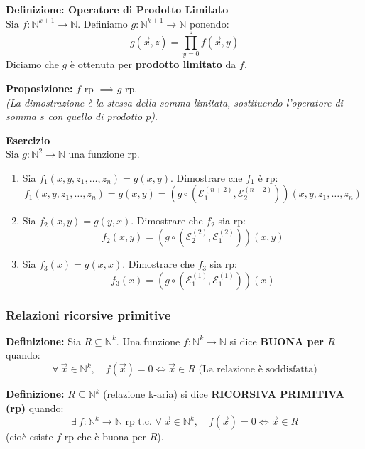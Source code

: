 \vspace{0.4cm}
\textbf{Definizione: Operatore di Prodotto Limitato} \\
Sia $f : \mathbb{N}^{k+1} \to \mathbb{N}$. Definiamo $g : \mathbb{N}^{k+1} \to \mathbb{N}$ ponendo:
$$ g(\vec{x}, z) = \prod_{y=0}^{z} f(\vec{x}, y) $$
Diciamo che $g$ è ottenuta per \textbf{prodotto limitato} da $f$.

\vspace{0.4cm}
\textbf{Proposizione:} $f$ rp $\implies g$ rp. \\
\textit{(La dimostrazione è la stessa della somma limitata, sostituendo l'operatore di somma $s$ con quello di prodotto $p$)}.

\vspace{0.6cm}
\textbf{Esercizio} \\
Sia $g: \mathbb{N}^2 \to \mathbb{N}$ una funzione rp.
\begin{enumerate}
    \item[a)] Sia $f_1(x, y, z_1, \dots, z_n) = g(x, y)$. Dimostrare che $f_1$ è rp:
    $$ f_1(x, y, z_1, \dots, z_n) = g(x, y) = \left( g \circ (\mathcal{E}_1^{(n+2)}, \mathcal{E}_2^{(n+2)}) \right)(x, y, z_1, \dots, z_n) $$
    
    \item[b)] Sia $f_2(x, y) = g(y, x)$. Dimostrare che $f_2$ sia rp:
    $$ f_2(x, y) = \left( g \circ (\mathcal{E}_2^{(2)}, \mathcal{E}_1^{(2)}) \right)(x, y) $$
    
    \item[c)] Sia $f_3(x) = g(x, x)$. Dimostrare che $f_3$ sia rp:
    $$ f_3(x) = \left( g \circ (\mathcal{E}_1^{(1)}, \mathcal{E}_1^{(1)}) \right)(x) $$
\end{enumerate}




\vspace{0.6cm}
\subsubsection{Relazioni ricorsive primitive}

\textbf{Definizione:} Sia $R \subseteq \mathbb{N}^k$. Una funzione $f: \mathbb{N}^k \to \mathbb{N}$ si dice \textbf{BUONA per $R$} quando:
$$ \forall\ \vec{x} \in \mathbb{N}^k, \quad f(\vec{x}) = 0 \iff \vec{x} \in R \text{  (La relazione è soddisfatta)}$$ 

\vspace{0.4cm}
\textbf{Definizione:} $R \subseteq \mathbb{N}^k$ (relazione k-aria) si dice \textbf{RICORSIVA PRIMITIVA (rp)} quando:
$$ \exists\ f: \mathbb{N}^k \to \mathbb{N} \text{ rp t.c. } \forall\ \vec{x} \in \mathbb{N}^k, \quad f(\vec{x}) = 0 \iff \vec{x} \in R $$
(cioè esiste $f$ rp che è buona per $R$).

